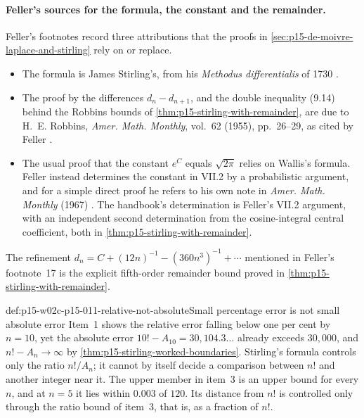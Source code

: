 \paragraph{Feller's sources for the formula, the constant and the remainder.}
Feller's footnotes record three attributions that the proofs in
\cref{sec:p15-de-moivre-laplace-and-stirling} rely on or replace.
\begin{itemize}
\item The formula is James Stirling's, from his \emph{Methodus
      differentialis} of 1730 \cite[p.~52, n.~14]{Feller1968ProbabilityI}.
\item The proof by the differences \(d_n-d_{n+1}\), and the double
      inequality (9.14) behind the Robbins bounds of
      \cref{thm:p15-stirling-with-remainder}, are due to H.~E. Robbins,
      \emph{Amer. Math. Monthly}, vol.~62 (1955), pp.~26--29, as cited by
      Feller \cite[p.~53, n.~15]{Feller1968ProbabilityI}.
\item The usual proof that the constant \(e^C\) equals \(\sqrt{2\pi}\)
      relies on Wallis's formula. Feller instead determines the constant in
      VII.2 by a probabilistic argument, and for a simple direct proof he
      refers to his own note in \emph{Amer. Math. Monthly} (1967)
      \cite[p.~53, n.~16]{Feller1968ProbabilityI}. The handbook's
      determination is Feller's VII.2 argument, with an independent second
      determination from the cosine-integral central coefficient, both in
      \cref{thm:p15-stirling-with-remainder}.
\end{itemize}
The refinement \(d_n=C+(12n)^{-1}-(360n^3)^{-1}+\cdots\) mentioned in
Feller's footnote~17 \cite[p.~54, n.~17]{Feller1968ProbabilityI} is the
explicit fifth-order remainder bound proved in
\cref{thm:p15-stirling-with-remainder}.

\begin{hbwarning}{def:p15-w02c-p15-011-relative-not-absolute}{Small percentage error is not small absolute error}
Item~1 shows the relative error falling below one per cent by \(n=10\), yet
the absolute error \(10!-A_{10}=30{,}104.3\ldots\) already exceeds
\(30{,}000\), and \(n!-A_n\to\infty\) by
\cref{thm:p15-stirling-worked-boundaries}. Stirling's formula controls only
the ratio \(n!/A_n\); it cannot by itself decide a comparison between \(n!\)
and another integer near it. The upper member in item~3 is an upper bound
for every \(n\), and at \(n=5\) it lies within \(0.003\) of \(120\). Its
distance from \(n!\) is controlled only through the ratio bound of item~3,
that is, as a fraction of \(n!\).
\end{hbwarning}

